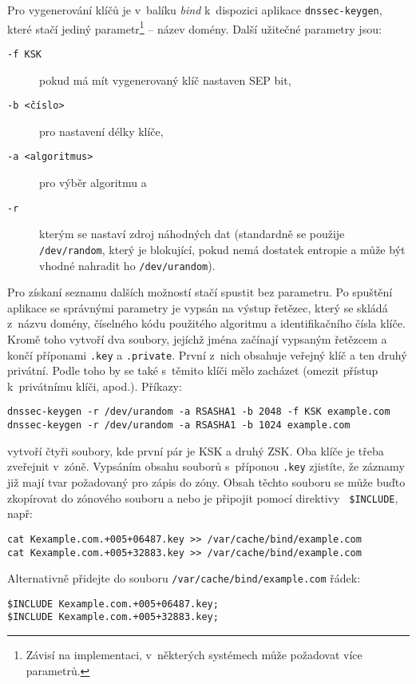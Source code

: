 Pro vygenerování klíčů je v~balíku {\em bind} k~dispozici aplikace {\tt dnssec-keygen}, které stačí jediný parametr\footnote{Závisí na implementaci, v~některých systémech může požadovat více parametrů.} -- název domény. Další užitečné parametry jsou:
\begin{description}
  \item[{\tt -f KSK}] pokud má mít vygenerovaný klíč nastaven SEP bit,
  \item[{\tt -b <číslo>}] pro nastavení délky klíče,
  \item[{\tt -a <algoritmus>}] pro výběr algoritmu a 
  \item[{\tt -r}] kterým se nastaví zdroj náhodných dat (standardně se použije {\tt /dev/random}, který je blokující, pokud nemá dostatek entropie a může být vhodné nahradit ho {\tt /dev/urandom}).
\end{description}
Pro získaní seznamu dalších možností stačí spustit bez parametru. Po spuštění aplikace se správnými parametry je vypsán na výstup řetězec, který se skládá z~názvu domény, číselného kódu použitého algoritmu a identifikačního čísla klíče. Kromě toho vytvoří dva soubory, jejíchž jména začínají vypsaným řetězcem a končí příponami {\tt .key} a {\tt .private}. První z~nich obsahuje veřejný klíč a ten druhý privátní. Podle toho by se také s~těmito klíči mělo zacházet (omezit přístup k~privátnímu klíči, apod.). Příkazy:

\begin{verbatim}
dnssec-keygen -r /dev/urandom -a RSASHA1 -b 2048 -f KSK example.com
dnssec-keygen -r /dev/urandom -a RSASHA1 -b 1024 example.com
\end{verbatim}
vytvoří čtyři soubory, kde první pár je KSK a druhý ZSK. Oba klíče je třeba
zveřejnit v~zóně. Vypsáním obsahu souborů s~příponou {\tt .key} zjistíte, že
záznamy již mají tvar požadovaný pro zápis do zóny. Obsah těchto souboru se může
buďto zkopírovat do zónového souboru a nebo je připojit pomocí direktivy {\tt
\$INCLUDE}, např:

\begin{verbatim}
cat Kexample.com.+005+06487.key >> /var/cache/bind/example.com
cat Kexample.com.+005+32883.key >> /var/cache/bind/example.com
\end{verbatim}

Alternativně přidejte do souboru {\tt /var/cache/bind/example.com} řádek:

\begin{verbatim}
$INCLUDE Kexample.com.+005+06487.key;
$INCLUDE Kexample.com.+005+32883.key;
\end{verbatim}


